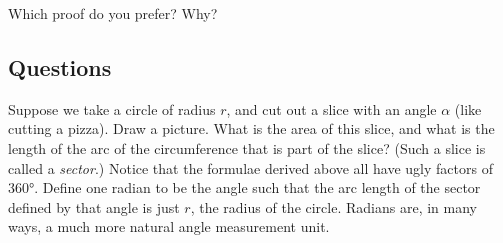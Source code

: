 Which proof do you prefer? Why?

\clearpage
\subsection*{Questions}
\begin{questions}
  \question Suppose we take a circle of radius $ r $, and cut out a slice with an angle $ \alpha $ (like cutting a pizza). Draw a picture.
            What is the area of this slice, and what is the length of the arc of the circumference that is part of the slice?
            (Such a slice is called a \textit{sector}.)
  \question Notice that the formulae derived above all have ugly factors of \ang{360}. Define one radian to be the angle such that the
            arc length of the sector defined by that angle is just $ r $, the radius of the circle. Radians are, in many ways, a much
            more natural angle measurement unit.
\end{questions}
